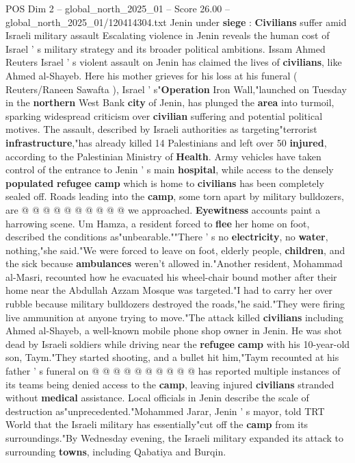 \begin{textsample}{POS Dim 2 – global\_north\_2025\_01 – Score 26.00 – global\_north\_2025\_01/120414304.txt}  \label{ex:f2_pos_367}
Jenin under \textbf{siege} : \textbf{Civilians} suffer amid Israeli military assault Escalating violence in Jenin reveals the human cost of Israel ' s military strategy and its broader political ambitions.
Issam Ahmed Reuters Israel ' s violent assault on Jenin has claimed the lives of \textbf{civilians}, like Ahmed al-Shayeb.
Here his mother grieves for his loss at his funeral ( Reuters/Raneen Sawafta ), Israel ' s"\textbf{Operation} Iron Wall,"launched on Tuesday in the \textbf{northern} West Bank \textbf{city} of Jenin, has plunged the \textbf{area} into turmoil, sparking widespread criticism over \textbf{civilian} suffering and potential political motives.
The assault, described by Israeli authorities as targeting"terrorist \textbf{infrastructure},"has already killed 14 Palestinians and left over 50 \textbf{injured}, according to the Palestinian Ministry of \textbf{Health}.
Army vehicles have taken control of the entrance to Jenin ' s main \textbf{hospital}, while access to the densely \textbf{populated} \textbf{refugee} \textbf{camp} which is home to \textbf{civilians} has been completely sealed off.
Roads leading into the \textbf{camp}, some torn apart by military bulldozers, are @ @ @ @ @ @ @ @ @ @ we approached. \textbf{Eyewitness} accounts paint a harrowing scene.
Um Hamza, a resident forced to \textbf{flee} her home on foot, described the conditions as"unbearable.""There ' s no \textbf{electricity}, no \textbf{water}, nothing,"she said."We were forced to leave on foot, elderly people, \textbf{children}, and the sick because \textbf{ambulances} weren't allowed in."Another resident, Mohammad al-Masri, recounted how he evacuated his wheel-chair bound mother after their home near the Abdullah Azzam Mosque was targeted."I had to carry her over rubble because military bulldozers destroyed the roads,"he said."They were firing live ammunition at anyone trying to move."The attack killed \textbf{civilians} including Ahmed al-Shayeb, a well-known mobile phone shop owner in Jenin.
He was shot dead by Israeli soldiers while driving near the \textbf{refugee} \textbf{camp} with his 10-year-old son, Taym."They started shooting, and a bullet hit him,"Taym recounted at his father ' s funeral on @ @ @ @ @ @ @ @ @ @ has reported multiple instances of its teams being denied access to the \textbf{camp}, leaving injured \textbf{civilians} stranded without \textbf{medical} assistance.
Local officials in Jenin describe the scale of destruction as"unprecedented."Mohammed Jarar, Jenin ' s mayor, told TRT World that the Israeli military has essentially"cut off the \textbf{camp} from its surroundings."By Wednesday evening, the Israeli military expanded its attack to surrounding \textbf{towns}, including Qabatiya and Burqin.

\end{textsample}
